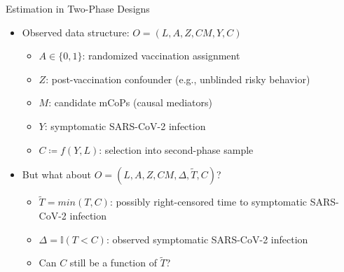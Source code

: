 \documentclass{beamer}
\begin{document}
\begin{frame}[c]{Estimation in Two-Phase Designs}

\begin{center}
\begin{itemize}
  \itemsep10pt
  \item Observed data structure: $O = (L, A, Z, CM, Y, C)$
      \begin{itemize}
          \item $A \in \{0, 1\}$: randomized vaccination assignment
          \item $Z$: post-vaccination confounder (e.g., unblinded risky behavior)
          \item $M$: candidate mCoPs (causal mediators)
          \item $Y$: symptomatic SARS-CoV-2 infection
          \item $C \coloneqq f(Y, L)$: selection into second-phase sample
      \end{itemize}
  \item But what about $O = (L, A, Z, CM, \Delta, \widetilde{T}, C)$?
      \begin{itemize}
          \item $\widetilde{T} = min(T,C)$: possibly right-censored time to
              symptomatic SARS-CoV-2 infection
          \item $\Delta = \mathbb{I}(T < C)$: observed symptomatic SARS-CoV-2
              infection
          \item Can $C$ still be a function of $\widetilde{T}$?
      \end{itemize}
\end{itemize}
\end{center}


\end{frame}

\end{document}
